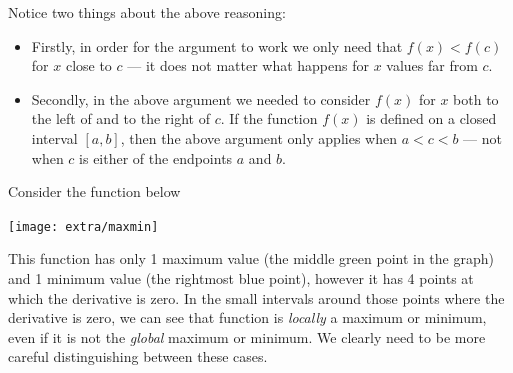 Notice two things about the above reasoning:
\begin{itemize}
 \item  Firstly, in order for the argument to work we
only need that $f(x)<f(c)$ for $x$ close to $c$ --- it does not matter what happens for
$x$ values far from $c$.
\item Secondly, in the above argument we needed to consider $f(x)$ for $x$ both
to the left of and to the right of $c$. If the function $f(x)$ is defined on a
closed interval $[a,b]$, then the above argument only applies when $a<c<b$ ---
not when $c$ is either of the endpoints $a$ and $b$.

\end{itemize}
Consider the function below
\begin{efig}
 \begin{center}
  \texttt{[image: extra/maxmin]}
 \end{center}
\end{efig}
This function has only 1 maximum value (the middle green point in the graph) and
1 minimum value (the rightmost blue point), however it has 4 points at which the
derivative is zero. In the small intervals around those points where the
derivative is zero, we can see that function is \emph{locally} a maximum or
minimum, even if it is not the \emph{global} maximum or minimum. We clearly need
to be more careful distinguishing between these cases.


